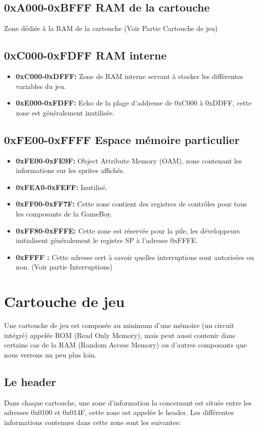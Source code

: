 \documentclass{report}
\begin{document}
\subsection{0xA000-0xBFFF RAM de la cartouche}
Zone dédiée à la RAM de la cartouche (Voir Partie Cartouche de jeu)

\subsection{0xC000-0xFDFF RAM interne}
\begin{itemize}
\item \textbf{0xC000-0xDFFF:} Zone de RAM interne servant à stocker les différentes variables du jeu.
\item \textbf{0xE000-0xFDFF:} Echo de la plage d'addresse de 0xC000 à 0xDDFF, cette zone est
généralement inutilisée.
\end{itemize} 

\subsection{0xFE00-0xFFFF Espace mémoire particulier}

\begin{itemize}
\item \textbf{0xFE00-0xFE9F:} Object Attribute Memory (OAM), zone contenant les informations
sur les sprites affichés.
\item \textbf{0xFEA0-0xFEFF:} Inutilisé.
\item \textbf{0xFF00-0xFF7F:} Cette zone contient des registres de contrôles pour tous les composants de la
GameBoy.
\item \textbf{0xFF80-0xFFFE:} Cette zone est réservée pour la pile, les
développeurs initialisent généralement le registre SP à l'adresse 0xFFFE.
\item \textbf{0xFFFF :} Cette adresse sert à savoir quelles interruptions sont autorisées ou
non. (Voir partie Interruptions)
\end{itemize} 

\section{Cartouche de jeu}
Une cartouche de jeu est composée au minimum d'une mémoire (un circuit intégré) appelée ROM (Read Only Memory), mais peut aussi contenir dans certains cas de la RAM (Random Access Memory) ou d'autres composants que nous verrons un peu plus loin.

\subsection{Le header}
Dans chaque cartouche, une zone d'information la concernant est située entre les adresses 0x0100 et 0x014F, cette zone est appelée le header. Les différentes informations contenues dans cette zone sont les suivantes:\\
\end{document}
